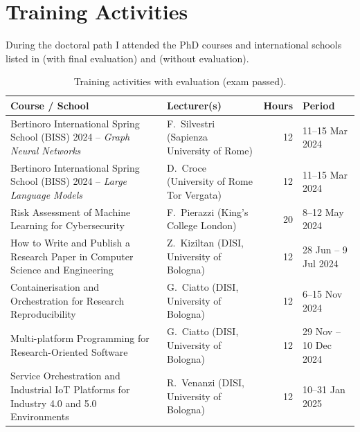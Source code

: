 \documentclass[a4paper,11pt]{article}
\begin{document}
\section{Training Activities}
\label{sec:training}

During the doctoral path I attended the PhD courses and international schools listed in  (with final evaluation) and  (without evaluation).

\begin{table}[H]
  \centering
  \footnotesize
  \caption{Training activities with evaluation (exam passed).}
  \label{tab:courses-eval}
  \begin{tabularx}{\textwidth}{@{}>{\raggedright\arraybackslash}X>{\raggedright\arraybackslash}p{4.2cm}rl@{}}
    \toprule
    Course / School & Lecturer(s) & Hours & Period \\
    \midrule
    Bertinoro International Spring School (BISS) 2024 -- \emph{Graph Neural Networks} & F.~Silvestri (Sapienza University of Rome) & 12 & 11--15 Mar 2024 \\ \addlinespace[3pt]
    Bertinoro International Spring School (BISS) 2024 -- \emph{Large Language Models} & D.~Croce (University of Rome Tor Vergata) & 12 & 11--15 Mar 2024 \\ \addlinespace[3pt]
    Risk Assessment of Machine Learning for Cybersecurity & F.~Pierazzi (King's College London) & 20 & 8--12 May 2024 \\ \addlinespace[3pt]
    How to Write and Publish a Research Paper in Computer Science and Engineering & Z.~Kiziltan (DISI, University of Bologna) & 12 & 28 Jun -- 9 Jul 2024 \\ \addlinespace[3pt]
    Containerisation and Orchestration for Research Reproducibility & G.~Ciatto (DISI, University of Bologna) & 12 & 6--15 Nov 2024 \\ \addlinespace[3pt]
    Multi-platform Programming for Research-Oriented Software & G.~Ciatto (DISI, University of Bologna) & 12 & 29 Nov -- 10 Dec 2024 \\ \addlinespace[3pt]
    Service Orchestration and Industrial IoT Platforms for Industry 4.0 and 5.0 Environments & R.~Venanzi (DISI, University of Bologna) & 12 & 10--31 Jan 2025 \\
    \bottomrule
  \end{tabularx}
\end{table}
\end{document}

